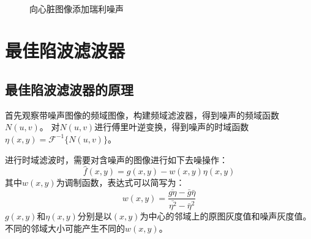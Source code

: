 \documentclass{article}
\begin{document}
\begin{figure}[H]
    \centering
    \,    
    \,
    \caption{向心脏图像添加瑞利噪声} 
\end{figure}

\section{最佳陷波滤波器}
\subsection{最佳陷波滤波器的原理}
首先观察带噪声图像的频域图像，构建频域滤波器，得到噪声的频域函数$N(u,v)$。
对$N(u,v)$进行傅里叶逆变换，得到噪声的时域函数$\eta(x,y)=\mathscr{F}^{-1}\{N(u,v)\}$。

进行时域滤波时，需要对含噪声的图像进行如下去噪操作：
\[
\hat{f}(x,y) = g(x,y) - w(x,y)\eta(x,y)	
\]
其中$w(x,y)$为调制函数，表达式可以简写为：
\[
w(x,y) = \frac{\overline{g\eta}-\bar{g}\bar{\eta}}{\bar{\eta^2}-\bar{\eta}^2}	
\]
$g(x,y)$和$\eta(x,y)$分别是以$(x,y)$为中心的邻域上的原图灰度值和噪声灰度值。
不同的邻域大小可能产生不同的$w(x,y)$。
\end{document}

